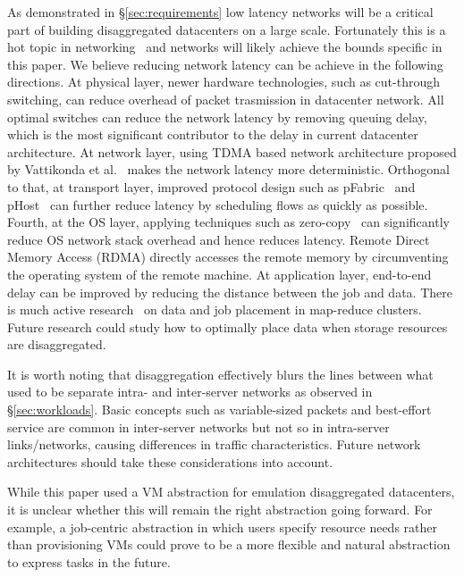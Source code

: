 As demonstrated in \S\ref{sec:requirements} low latency networks will be a critical part of building  disaggregated datacenters on a large scale. Fortunately this is a hot topic in networking~\cite{lowlatency} and networks will likely achieve the bounds specific in this paper.
We believe reducing network latency can be achieve in the following directions.
At physical layer, newer hardware technologies, such as cut-through switching, can reduce overhead of packet trasmission in datacenter network. All optimal switches can reduce the network latency by removing queuing delay, which is the most significant contributor to the delay in current datacenter architecture.
At network layer, using TDMA based network architecture proposed by Vattikonda et al.~\cite{tdma} makes the network latency more deterministic. 
Orthogonal to that, at transport layer, improved protocol design such as pFabric~\cite{pfabric} and pHost~\cite{phost} can further reduce latency by scheduling flows as quickly as possible. 
Fourth, at the OS layer, applying techniques such as zero-copy~\cite{netmap} can significantly reduce OS network stack overhead and hence reduces latency.
Remote Direct Memory Access (RDMA) directly accesses the remote memory by circumventing the operating system of the remote machine.
At application layer, end-to-end delay can be improved by reducing the distance between the job and data. There is much active research~\cite{endpoint} on data and job placement in map-reduce clusters. Future research could study how to optimally place data when storage resources are disaggregated.

It is worth noting that disaggregation effectively blurs the lines between what used to be separate intra- and inter-server networks as observed in \S\ref{sec:workloads}. Basic concepts such as variable-sized packets and best-effort service are common in inter-server networks but not so in intra-server links/networks, causing differences in traffic characteristics. Future network architectures should take these considerations into account.

While this paper used a VM abstraction for emulation disaggregated datacenters, it is unclear whether this will remain the right abstraction going forward. For example, a job-centric abstraction in which users specify resource needs rather than provisioning VMs could prove to be a more flexible and natural abstraction to express tasks in the future.




